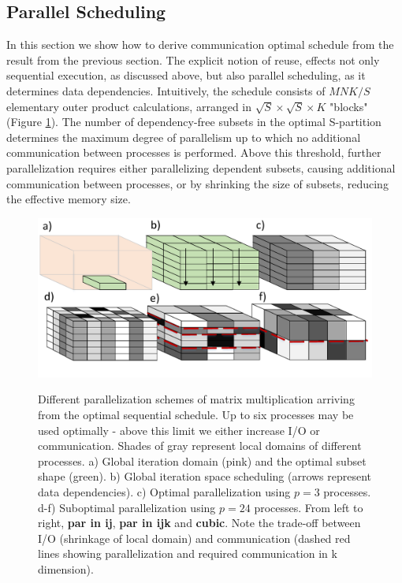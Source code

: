 \documentclass[sigplan,review,anonymous]{acmart}\settopmatter{printfolios=true,printccs=false,printacmref=false}
\begin{document}
\subsection{Parallel Scheduling}
\label{sec:parScheduling}

In this section we show how to derive communication optimal schedule from the 
result from the previous section.
The explicit notion of reuse, effects not only sequential execution, as 
discussed above, but also parallel scheduling, as it determines data 
dependencies.
 Intuitively, the schedule consists 
of $MNK/S$ elementary outer product calculations, arranged in $\sqrt{S} \times 
\sqrt{S} \times K$ "blocks" (Figure \ref{fig:mmmParallelization}). The number 
of dependency-free 
subsets in the optimal S-partition determines the maximum degree of parallelism 
up 
to which no additional communication between processes is performed. Above 
this 
threshold, 
further parallelization requires either parallelizing dependent subsets, 
causing additional communication between processes, or by shrinking the size of 
subsets, reducing the effective memory size.

 \begin{figure}
	\includegraphics[width=\columnwidth]{figures/mmm_parallelization}
	\label{fig:mmmParallelization}
	\caption{Different parallelization schemes of matrix multiplication 
	arriving from the optimal sequential schedule. Up to six processes may be 
	used optimally - above this limit we either increase I/O or communication. 
	Shades of gray represent local domains of different processes. a) Global 
	iteration domain (pink) and the optimal subset shape (green). b) Global 
	iteration space scheduling (arrows represent data dependencies). c) Optimal 
	parallelization using $p=3$ processes. d-f) Suboptimal parallelization 
	using $p=24$ processes. From left to right, \textbf{par in ij}, \textbf{par 
	in ijk} and \textbf{cubic}. Note the trade-off between I/O (shrinkage of 
	local domain) and communication (dashed red lines showing parallelization 
	and required communication in k dimension).} 
\end{figure}
\end{document}
